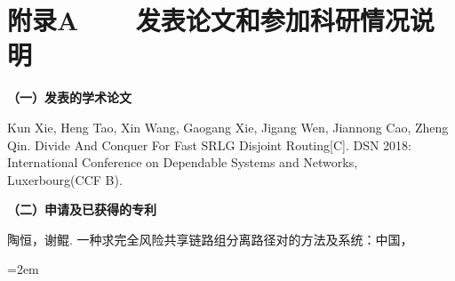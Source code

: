
\chapter*{附录A~~~~发表论文和参加科研情况说明}
\setlength{\parindent}{0em}
\textbf{（一）发表的学术论文}
\begin{publist}
\item Kun Xie, Heng Tao, Xin Wang, Gaogang Xie, Jigang Wen, Jiannong Cao, Zheng Qin. Divide And Conquer For Fast SRLG Disjoint Routing[C]. DSN 2018: International Conference on Dependable Systems and Networks, Luxerbourg(CCF B).
\end{publist}

\vspace*{1em}
\textbf{（二）申请及已获得的专利}
\begin{publist}
\item 陶恒，谢鲲. 一种求完全风险共享链路组分离路径对的方法及系统：中国，%
\end{publist}
\vfill
{}\hangindent=2em\noindent

\setlength{\parindent}{2em}
